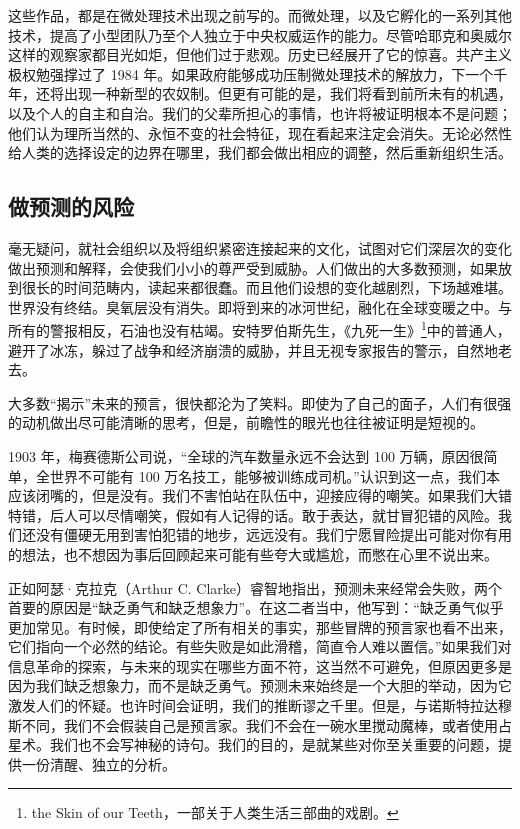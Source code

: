 这些作品，都是在微处理技术出现之前写的。而微处理，以及它孵化的一系列其他技术，提高了小型团队乃至个人独立于中央权威运作的能力。尽管哈耶克和奥威尔这样的观察家都目光如炬，但他们过于悲观。历史已经展开了它的惊喜。共产主义极权勉强撑过了 1984 年。如果政府能够成功压制微处理技术的解放力，下一个千年，还将出现一种新型的农奴制。但更有可能的是，我们将看到前所未有的机遇，以及个人的自主和自治。我们的父辈所担心的事情，也许将被证明根本不是问题；他们认为理所当然的、永恒不变的社会特征，现在看起来注定会消失。无论必然性给人类的选择设定的边界在哪里，我们都会做出相应的调整，然后重新组织生活。


\subsection{做预测的风险}
毫无疑问，就社会组织以及将组织紧密连接起来的文化，试图对它们深层次的变化做出预测和解释，会使我们小小的尊严受到威胁。人们做出的大多数预测，如果放到很长的时间范畴内，读起来都很蠢。而且他们设想的变化越剧烈，下场越难堪。世界没有终结。臭氧层没有消失。即将到来的冰河世纪，融化在全球变暖之中。与所有的警报相反，石油也没有枯竭。安特罗伯斯先生，《九死一生》\footnote{the Skin of our Teeth，一部关于人类生活三部曲的戏剧。}中的普通人，避开了冰冻，躲过了战争和经济崩溃的威胁，并且无视专家报告的警示，自然地老去。


大多数“揭示”未来的预言，很快都沦为了笑料。即使为了自己的面子，人们有很强的动机做出尽可能清晰的思考，但是，前瞻性的眼光也往往被证明是短视的。


1903 年，梅赛德斯公司说，“全球的汽车数量永远不会达到 100 万辆，原因很简单，全世界不可能有 100 万名技工，能够被训练成司机。”认识到这一点，我们本应该闭嘴的，但是没有。我们不害怕站在队伍中，迎接应得的嘲笑。如果我们大错特错，后人可以尽情嘲笑，假如有人记得的话。敢于表达，就甘冒犯错的风险。我们还没有僵硬无用到害怕犯错的地步，远远没有。我们宁愿冒险提出可能对你有用的想法，也不想因为事后回顾起来可能有些夸大或尴尬，而憋在心里不说出来。


正如阿瑟·克拉克（Arthur C. Clarke）睿智地指出，预测未来经常会失败，两个首要的原因是“缺乏勇气和缺乏想象力”。在这二者当中，他写到：“缺乏勇气似乎更加常见。有时候，即使给定了所有相关的事实，那些冒牌的预言家也看不出来，它们指向一个必然的结论。有些失败是如此滑稽，简直令人难以置信。”如果我们对信息革命的探索，与未来的现实在哪些方面不符，这当然不可避免，但原因更多是因为我们缺乏想象力，而不是缺乏勇气。预测未来始终是一个大胆的举动，因为它激发人们的怀疑。也许时间会证明，我们的推断谬之千里。但是，与诺斯特拉达穆斯不同，我们不会假装自己是预言家。我们不会在一碗水里搅动魔棒，或者使用占星术。我们也不会写神秘的诗句。我们的目的，是就某些对你至关重要的问题，提供一份清醒、独立的分析。



